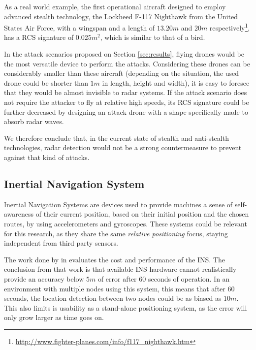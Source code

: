 \documentclass{article}
\begin{document}
As a real world example, the first operational aircraft designed to employ advanced stealth technology, the Lockheed F-117 Nighthawk from the United States Air Force, with a wingspan and a length of $13.20m$ and $20m$ respectively\footnote{\url{http://www.fighter-planes.com/info/f117_nighthawk.htm}}, has a RCS signature of $0.025m^2$, which is similar to that of a bird\cite{cadirci2009rf}.

In the attack scenarios proposed on Section \ref{sec:results}, flying drones would be the most versatile device to perform the attacks. Considering these drones can be considerably smaller than these aircraft (depending on the situation, the used drone could be shorter than $1m$ in length, height and width), it is easy to foresee that they would be almost invisible to radar systems. If the attack scenario does not require the attacker to fly at relative high speeds, its RCS signature could be further decreased by designing an attack drone with a shape specifically made to absorb radar waves. 

We therefore conclude that, in the current state of stealth and anti-stealth technologies, radar detection would not be a strong countermeasure to prevent against that kind of attacks.



\subsection{Inertial Navigation System}

Inertial Navigation Systems are devices used to provide machines a sense of self-awareness of their current position, based on their initial position and the chosen routes, by using accelerometers and gyroscopes. These systems could be relevant for this research, as they share the same \emph{relative positioning} focus, staying independent from third party sensors.

The work done by \citeauthor{woodman2007introduction} in \cite{woodman2007introduction} evaluates the cost and performance of the INS. The conclusion from that work is that available INS hardware cannot realistically provide an accuracy below $5m$ of error after $60$ seconds of operation. In an environment with multiple nodes using this system, this means that after $60$ seconds, the location detection between two nodes could be as biased as $10m$. This also limits is usability as a stand-alone positioning system, as the error will only grow larger as time goes on.
\end{document}
